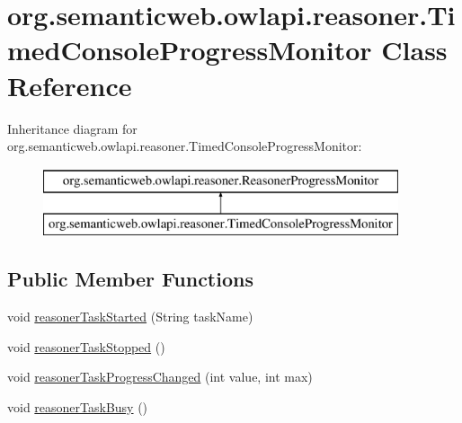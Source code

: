 \hypertarget{classorg_1_1semanticweb_1_1owlapi_1_1reasoner_1_1_timed_console_progress_monitor}{\section{org.\-semanticweb.\-owlapi.\-reasoner.\-Timed\-Console\-Progress\-Monitor Class Reference}
\label{classorg_1_1semanticweb_1_1owlapi_1_1reasoner_1_1_timed_console_progress_monitor}
}
Inheritance diagram for org.\-semanticweb.\-owlapi.\-reasoner.\-Timed\-Console\-Progress\-Monitor\-:\begin{figure}[H]
\begin{center}
\leavevmode
\includegraphics[height=2.000000cm]{classorg_1_1semanticweb_1_1owlapi_1_1reasoner_1_1_timed_console_progress_monitor}
\end{center}
\end{figure}
\subsection*{Public Member Functions}
\begin{DoxyCompactItemize}
\item 
void \hyperlink{classorg_1_1semanticweb_1_1owlapi_1_1reasoner_1_1_timed_console_progress_monitor_a33d51921edbe697bb6614be735c84c3d}{reasoner\-Task\-Started} (String task\-Name)
\item 
void \hyperlink{classorg_1_1semanticweb_1_1owlapi_1_1reasoner_1_1_timed_console_progress_monitor_a547386d1812ab63b4e65399ddb113808}{reasoner\-Task\-Stopped} ()
\item 
void \hyperlink{classorg_1_1semanticweb_1_1owlapi_1_1reasoner_1_1_timed_console_progress_monitor_ac21d6855a1e52a5a66291eb79cf7b7db}{reasoner\-Task\-Progress\-Changed} (int value, int max)
\item 
void \hyperlink{classorg_1_1semanticweb_1_1owlapi_1_1reasoner_1_1_timed_console_progress_monitor_a246ad7153b804778e89e252e105e8df9}{reasoner\-Task\-Busy} ()
\end{DoxyCompactItemize}

